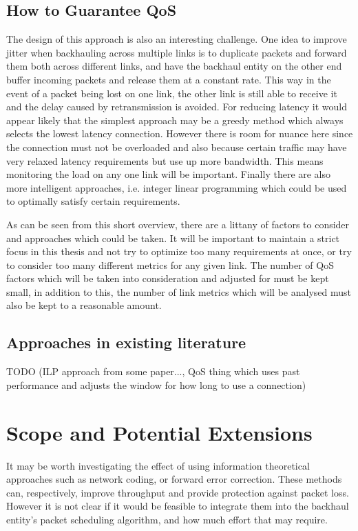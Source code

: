 \subsection{How to Guarantee QoS}

The design of this approach is also an interesting challenge. One idea to improve jitter when backhauling across multiple links is to duplicate packets and forward them both across different links, and have the backhaul entity on the other end buffer incoming packets and release them at a constant rate. This way in the event of a packet being lost on one link, the other link is still able to receive it and the delay caused by retransmission is avoided. For reducing latency it would appear likely that the simplest approach may be a greedy method which always selects the lowest latency connection. However there is room for nuance here since the connection must not be overloaded and also because certain traffic may have very relaxed latency requirements but use up more bandwidth. This means monitoring the load on any one link will be important. Finally there are also more intelligent approaches, i.e. integer linear programming which could be used to optimally satisfy certain requirements.

As can be seen from this short overview, there are a littany of factors to consider and approaches which could be taken. It will be important to maintain a strict focus in this thesis and not try to optimize too many requirements at once, or try to consider too many different metrics for any given link. The number of QoS factors which will be taken into consideration and adjusted for must be kept small, in addition to this, the number of link metrics which will be analysed must also be kept to a reasonable amount.

\subsection{Approaches in existing literature}

TODO (ILP approach from some paper..., QoS thing which uses past performance and adjusts the window for how long to use a connection)

\section{Scope and Potential Extensions}

It may be worth investigating the effect of using information theoretical approaches such as network coding, or forward error correction. These methods can, respectively, improve throughput and provide protection against packet loss. However it is not clear if it would be feasible to integrate them into the backhaul entity's packet scheduling algorithm, and how much effort that may require.

